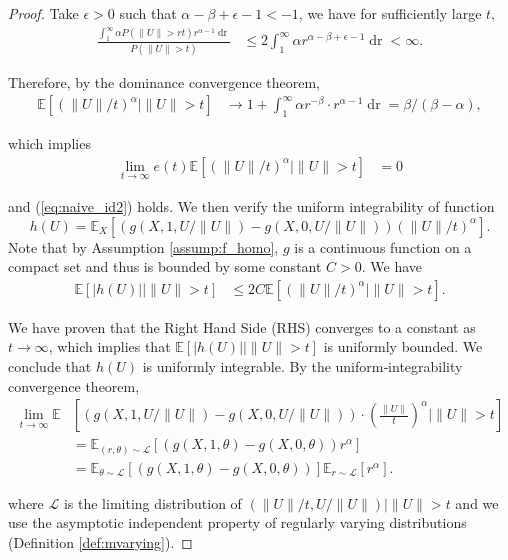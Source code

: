 \documentclass[12pt]{article}
\theoremstyle{plain}
\theoremstyle{definition}
\newcommand{\tmop}[1]{\ensuremath{\operatorname{#1}}}
\begin{document}
\begin{proof}
Take $\epsilon > 0$ such that $\alpha -\beta + \epsilon - 1 < - 1$, we have for sufficiently large $t$, 
\begin{align*}
  \frac{\int_1^{\infty} \alpha P (\| U \| > {rt}) r^{\alpha - 1}
  \tmop{dr}}{P (\| U \| > t)} & \leqslant 2\int^{\infty}_1 \alpha r^{\alpha -\beta + \epsilon - 1} \tmop{dr} < \infty .
\end{align*}

Therefore, by the dominance
convergence theorem,
\begin{align*}
  \mathbb{E} [(\| U \| / t)^{\alpha} \mid \| U \| > t] & \rightarrow 1 +
  \int_1^{\infty} \alpha r^{- \beta} \cdot r^{\alpha - 1} \tmop{dr} = \beta /
  (\beta - \alpha),
\end{align*}

which implies
\begin{align*}
  \lim_{t \rightarrow \infty} e (t) \mathbb{E} [(\| U \| / t)^{\alpha} \mid \|
  U \| > t] & = 0
\end{align*}

and (\ref{eq:naive_id2}) holds. We then verify the uniform integrability of
function
\[ h (U) =\mathbb{E}_X [(g (X, 1, U / \| U \|) - g (X, 0, U / \| U \|)) (\| U
   \| / t)^{\alpha}] . \]
Note that by Assumption \ref{assump:f_homo}, $g$ is a continuous function on a
compact set and thus is bounded by some constant $C > 0$. We have
\begin{align*}
  \mathbb{E} [| h (U) | \mid \| U \| > t] & \leqslant 2 C\mathbb{E} [(\|
  U \| / t)^{\alpha} \mid \| U \| > t] .
\end{align*}

We have proven that the Right Hand Side (RHS) converges to a constant as $t
\rightarrow \infty$, which implies that $\mathbb{E} [| h (U) | \mid \| U \| >
t]$ is uniformly bounded. We conclude that $h (U)$ is uniformly integrable. By the uniform‐integrability convergence theorem,
\begin{align*}
  \lim_{t \rightarrow \infty} \mathbb{E} &\left[ (g (X, 1, U / \| U \|) - g (X,
  0, U / \| U \|)) \cdot \left( \frac{\|U\|}{t} \right)^{\alpha} \mid \|U\|> t
  \right] \\
  & =\mathbb{E}_{(r, \theta) \sim \mathcal{L}} [(g (X, 1, \theta) - g
  (X, 0, \theta)) r^{\alpha}]\\
  & =\mathbb{E}_{\theta \sim \mathcal{L}} [(g (X, 1, \theta) - g (X, 0, \theta))] \mathbb{E}_{r \sim \mathcal{L}}
  [r^{\alpha}] .
\end{align*}

where $\mathcal{L} $ is the limiting distribution of $(\| U \| / t, U / \| U
\|) \mid \| U \| > t$ and we use the asymptotic independent property of regularly varying distributions (Definition \ref{def:mvarying}).
\end{proof}
\end{document}
